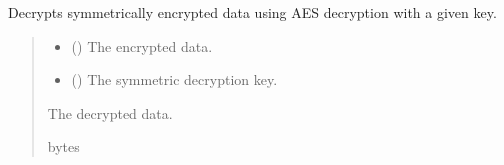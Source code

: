 \documentclass[letterpaper,10pt,english]{sphinxmanual}
\begin{document}
\begin{fulllineitems}
\label{\detokenize{encryption:encryption.decrypt_symmetric}}
\pysigstartsignatures
{}
\pysigstopsignatures
\sphinxAtStartPar
Decrypts symmetrically encrypted data using AES decryption with a given key.
\begin{quote}\begin{description}
\begin{itemize}
\item {} 
\sphinxAtStartPar
{} () \textendash{} The encrypted data.

\item {} 
\sphinxAtStartPar
{} () \textendash{} The symmetric decryption key.

\end{itemize}

\sphinxAtStartPar
The decrypted data.

\sphinxAtStartPar
bytes

\end{description}\end{quote}

\end{fulllineitems}

\end{document}
